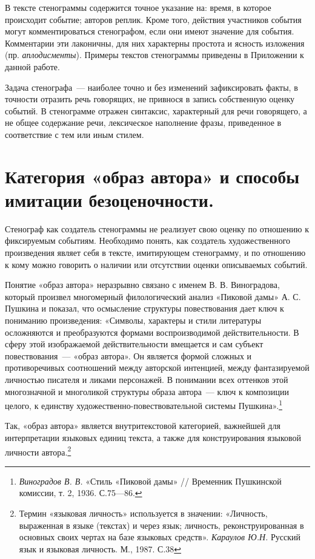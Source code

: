 \documentclass{kursa4}
\begin{document}
      В тексте стенограммы содержится точное указание на: время, в которое происходит событие; авторов реплик. Кроме того, действия участников события могут комментироваться стенографом, если они имеют значение для события. Комментарии эти лаконичны, для них характерны простота и ясность изложения (пр. \textit{аплодисменты}). Примеры текстов стенограммы приведены в Приложении к данной работе. 

      Задача стенографа~--- наиболее точно и без изменений зафиксировать факты, в точности отразить речь говорящих, не привнося в запись собственную оценку событий. В стенограмме отражен синтаксис, характерный для речи говорящего, а не общее содержание речи, лексическое наполнение фразы, приведенное в соответствие с тем или иным стилем. 

    \section{Категория «образ автора» и способы имитации безоценочности.}

      Стенограф как создатель стенограммы не реализует свою оценку по отношению к фиксируемым событиям. Необходимо понять, как создатель художественного произведения являет себя в тексте, имитирующем стенограмму, и по отношению к кому можно говорить о наличии или отсутствии оценки описываемых событий. 

      Понятие «образ автора» неразрывно связано с именем В. В. Виноградова, который произвел многомерный филологический анализ «Пиковой дамы» А. С. Пушкина и показал, что осмысление структуры повествования дает ключ к пониманию произведения: «Символы, характеры и стили литературы осложняются и преобразуются формами воспроизводимой действительности. В сферу этой изображаемой действительности вмещается и сам субъект повествования~--- «образ автора». Он является формой сложных и противоречивых соотношений между авторской интенцией, между фантазируемой личностью писателя и ликами персонажей. В понимании всех оттенков этой многозначной и многоликой структуры образа автора~--- ключ к композиции целого, к единству художественно-повествовательной системы Пушкина».\footnote{\textit{{Виноградов В. В. }}{«Стиль «Пиковой дамы» // Временник Пушкинской комиссии, т. 2, 1936. С.75—86.}} 

      Так, «образ автора» является внутритекстовой категорией, важнейшей для интерпретации языковых единиц текста, а также для конструирования языковой личности автора.\footnote{{Термин «языковая личность» используется в значении: «Личность, выраженная в языке (текстах) и через язык; личность, реконструированная в основных своих чертах на базе языковых средств». }\textit{{Караулов Ю.Н. }}{Русский язык и языковая личность. М., 1987. С.38}} 
\end{document}
